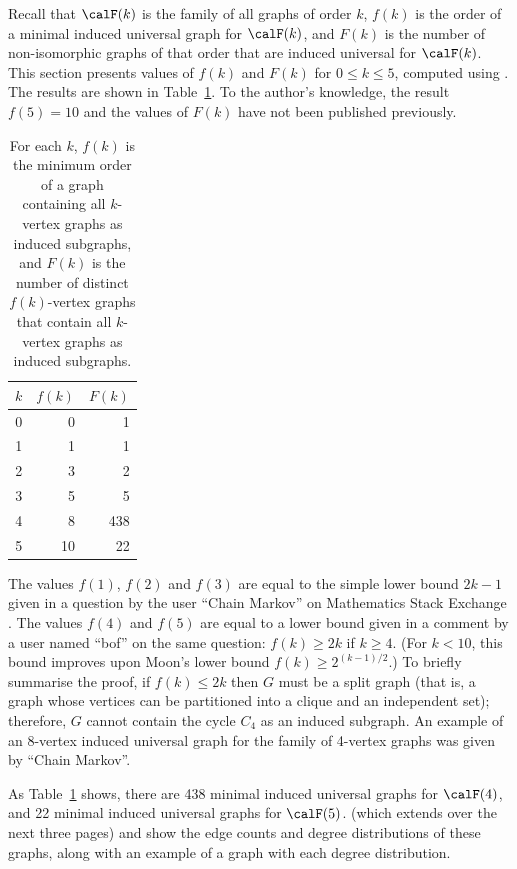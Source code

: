 Recall that $\calF(k)$ is the family of all graphs of order $k$, $f(k)$ is
the order of a minimal induced universal graph for
$\calF(k)$, and $F(k)$ is the number of non-isomorphic graphs of that order
that are induced universal for $\calF(k)$.  This section
presents values of $f(k)$ and $F(k)$ for $0 \leq k \leq 5$, computed
using . The results are shown in 
Table~\ref{tab:graphresults}.  To the author's knowledge, the result
$f(5)=10$ and the values of $F(k)$ have not been published previously.


\begin{table}[h!]
\centering
\footnotesize
\begin{tabular}{r r r}
 \toprule
 $k$ & $f(k)$ & $F(k)$ \\ [0.5ex]
 \midrule
 0 & 0 & 1 \\
 1 & 1 & 1 \\
 2 & 3 & 2 \\
 3 & 5 & 5 \\
 4 & 8 & 438 \\
 5 & 10 & 22 \\
 \bottomrule
\end{tabular}
\caption{For each $k$, $f(k)$ is the minimum order of a graph containing all $k$-vertex graphs as
induced subgraphs, and $F(k)$ is the number of distinct $f(k)$-vertex graphs that contain
all $k$-vertex graphs as induced subgraphs.}
\label{tab:graphresults}
\end{table}


The values $f(1)$, $f(2)$ and $f(3)$ are equal to the simple lower bound $2k
- 1$ given in a question by the user ``Chain Markov'' on Mathematics Stack Exchange
  \citep{math_se_question}.  The values $f(4)$ and $f(5)$ are equal to a lower
  bound given in a comment by a user named ``bof'' on the same question: $f(k) \geq 2k$ if $k
  \geq 4$.  (For $k < 10$, this bound improves upon Moon's lower bound $f(k)
  \geq 2^{(k-1)/2}$.) To briefly summarise the proof, if $f(k) \leq 2k$ then $G$
  must be a split graph (that is, a graph whose vertices can be partitioned
  into a clique and an independent set); therefore, $G$ cannot contain the
  cycle $C_4$ as an induced subgraph.  An example of an 8-vertex induced
  universal graph for the family of 4-vertex graphs was given by
  ``Chain Markov''.
%
%

As Table~\ref{tab:graphresults} shows, there are 438 minimal
induced universal graphs for $\calF(4)$,
and 22 minimal induced universal graphs for $\calF(5)$.
 (which extends over the next
three pages) and
 show the edge counts and degree distributions
of these graphs, along with an example of a graph with each degree distribution.


